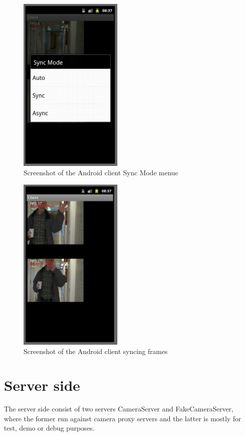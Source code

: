 \documentclass[8pt,titlepage]{article}
\begin{document}
\begin{figure}[hbp]
\centering
\includegraphics[width=0.45\textwidth]{../screenshots/androidSyncMode.png}
\caption{Screenshot of the Android client Sync Mode menue}
\end{figure}

\begin{figure}[hbp]
\centering
\includegraphics[width=0.45\textwidth]{../screenshots/androidSyncing.png}
\caption{Screenshot of the Android client syncing frames}
\end{figure}


\clearpage
\section{Server side}
The server side consist of two servers CameraServer and FakeCameraServer, where the former run against camera proxy servers and the latter is mostly for test, demo or debug purposes.
\end{document}
